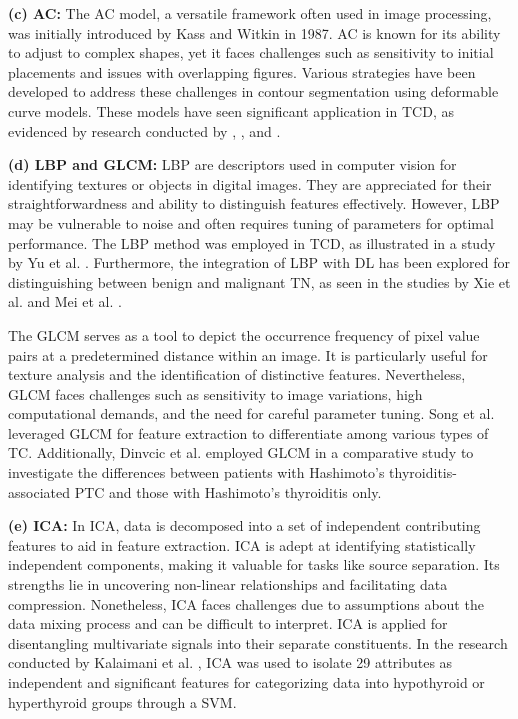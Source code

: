 \documentclass[a4paper,fleqn]{cas-sc}
\begin{document}
\noindent \textbf{(c) \Acf{AC}:} The \ac{AC} model, a versatile framework often used in image processing, was initially introduced by Kass and Witkin in 1987. \ac{AC} is known for its ability to adjust to complex shapes, yet it faces challenges such as sensitivity to initial placements and issues with overlapping figures. Various strategies have been developed to address these challenges in contour segmentation using deformable curve models. These models have seen significant application in \ac{TCD}, as evidenced by research conducted by \cite{poudel2017active}, \cite{poudel20163d}, and \cite{nugroho2015thyroid}.

\noindent \textbf{(d) LBP and GLCM:}
\ac{LBP} are descriptors used in computer vision for identifying textures or objects in digital images. They are appreciated for their straightforwardness and ability to distinguish features effectively. However, \ac{LBP} may be vulnerable to noise and often requires tuning of parameters for optimal performance. The \ac{LBP} method was employed in \ac{TCD}, as illustrated in a study by Yu et al. \cite{yu2019transverse}. Furthermore, the integration of \ac{LBP} with \ac{DL} has been explored for distinguishing between benign and malignant \ac{TN}, as seen in the studies by Xie et al. \cite{xie2020hybrid} and Mei et al. \cite{mei2017thyroid}.

The \ac{GLCM} serves as a tool to depict the occurrence frequency of pixel value pairs at a predetermined distance within an image. It is particularly useful for texture analysis and the identification of distinctive features. Nevertheless, \ac{GLCM} faces challenges such as sensitivity to image variations, high computational demands, and the need for careful parameter tuning. Song et al. \cite{song2015model} leveraged \ac{GLCM} for feature extraction to differentiate among various types of TC. Additionally, Dinvcic et al. \cite{dinvcic2020fractal} employed \ac{GLCM} in a comparative study to investigate the differences between patients with Hashimoto's thyroiditis-associated \ac{PTC} and those with Hashimoto's thyroiditis only.

\noindent \textbf{(e) ICA:} In \ac{ICA}, data is decomposed into a set of independent contributing features to aid in feature extraction. \ac{ICA} is adept at identifying statistically independent components, making it valuable for tasks like source separation. Its strengths lie in uncovering non-linear relationships and facilitating data compression. Nonetheless, \ac{ICA} faces challenges due to assumptions about the data mixing process and can be difficult to interpret. \ac{ICA} is applied for disentangling multivariate signals into their separate constituents. In the research conducted by Kalaimani et al. \cite{kalaimani2019analysis}, \ac{ICA} was used to isolate 29 attributes as independent and significant features for categorizing data into hypothyroid or hyperthyroid groups through a \ac{SVM}.\\
\end{document}
